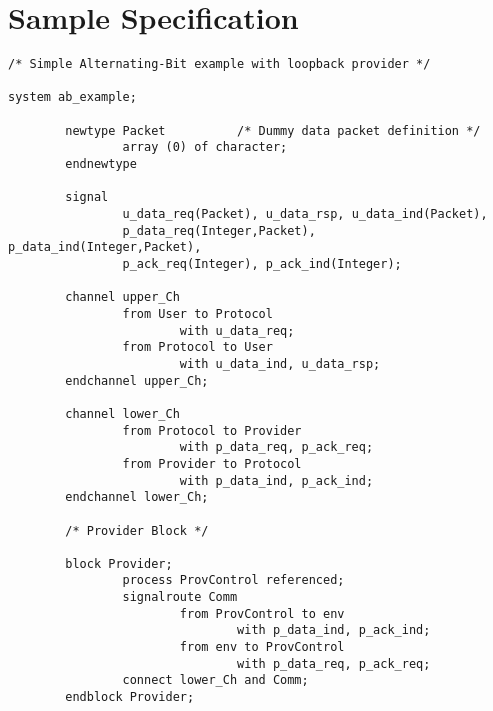 \newpage
\section{Sample Specification}

\begin{verbatim}
/* Simple Alternating-Bit example with loopback provider */

system ab_example;

        newtype Packet          /* Dummy data packet definition */
                array (0) of character;
        endnewtype

        signal
                u_data_req(Packet), u_data_rsp, u_data_ind(Packet),
                p_data_req(Integer,Packet), p_data_ind(Integer,Packet),
                p_ack_req(Integer), p_ack_ind(Integer);

        channel upper_Ch
                from User to Protocol
                        with u_data_req;
                from Protocol to User
                        with u_data_ind, u_data_rsp;
        endchannel upper_Ch;

        channel lower_Ch
                from Protocol to Provider
                        with p_data_req, p_ack_req;
                from Provider to Protocol
                        with p_data_ind, p_ack_ind;
        endchannel lower_Ch;

        /* Provider Block */

        block Provider;
                process ProvControl referenced;
                signalroute Comm
                        from ProvControl to env
                                with p_data_ind, p_ack_ind;
                        from env to ProvControl
                                with p_data_req, p_ack_req;
                connect lower_Ch and Comm;
        endblock Provider;
\end{verbatim}
\newpage
